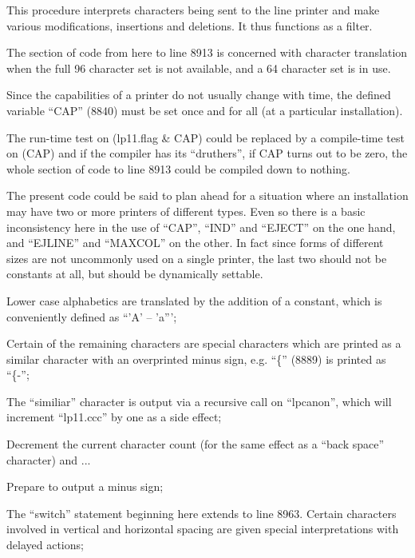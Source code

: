 This procedure interprets characters
being sent to the line printer and make
various modifications, insertions and
deletions. It thus functions as a
filter.

\bd
\item[8884:] The section of code from here to
line 8913 is concerned with character translation when the full
96 character set is not available, and a 64 character set is
in use.

Since the capabilities of a
printer do not usually change
with time, the defined variable
``CAP'' (8840) must be set once and
for all (at a particular installation).

The run-time test on (lp11.flag \& CAP)
could be replaced by a compile-time test on
(CAP) and if the compiler has its
``druthers'', if CAP turns out to
be zero, the whole section of
code to line 8913 could be compiled down to nothing.

The present code could be said
to plan ahead for a situation
where an installation may have
two or more printers of different
types. Even so there is a basic
inconsistency here in the use of
``CAP'', ``IND'' and ``EJECT'' on the
one hand, and ``EJLINE'' and ``MAXCOL'' on the other. In fact since
forms of different sizes are not
uncommonly used on a single
printer, the last two should not
be constants at all, but should
be dynamically settable.

\item[8885:] Lower case alphabetics are
translated by the addition of a
constant, which is conveniently
defined as ``'A' -- 'a''';

\item[8887:] Certain of the remaining characters are special characters which
are printed as a similar character with an overprinted minus
sign, e.g. ``\{'' (8889) is printed as ``\{-'';

\item[8909:] The ``similiar'' character is output
via a recursive call on
``lpcanon'', which will increment
``lp11.ccc'' by one as a side
effect;

\item[8910:] Decrement the current character
count (for the same effect as a
``back space'' character) and ...

\item[8911:] Prepare to output a minus sign;

\item[8915:] The ``switch'' statement beginning here
extends to line 8963. Certain characters involved in vertical
and horizontal spacing are given special interpretations
with delayed actions;

